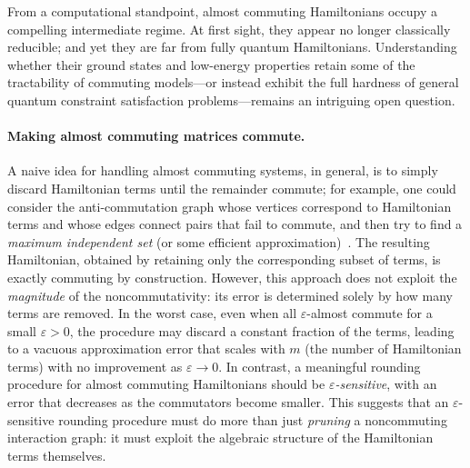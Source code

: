 \documentclass[a4paper,onecolumn,11pt]{quantumarticle}
\theoremstyle{plain}
\begin{document}
From a computational standpoint, almost commuting Hamiltonians occupy a compelling intermediate regime.  At first sight, they appear no longer classically reducible; and yet they are far from fully quantum Hamiltonians.  Understanding whether their ground states and low-energy properties retain some of the tractability of commuting models—or instead exhibit the full hardness of general quantum constraint satisfaction problems—remains an intriguing open question. 





\paragraph{Making almost commuting matrices commute.}

A naive idea for handling almost commuting systems, in general, is to simply discard Hamiltonian terms until the remainder commute; for example, one could consider the anti-commutation graph whose vertices correspond to Hamiltonian terms and whose edges connect pairs that fail to commute, and then try to find a \emph{maximum independent set} (or some efficient approximation)~\cite{10.1007/BF01994876}. The resulting Hamiltonian, obtained by retaining only the corresponding subset of terms, is exactly commuting by construction. However, this approach does not exploit the \emph{magnitude} of the noncommutativity: its error is determined solely by how many terms are removed. In the worst case, even when all $\varepsilon$-almost commute for a small $\varepsilon >0$, the procedure may discard a constant fraction of the terms, leading to a vacuous approximation error that scales with $m$ (the number of Hamiltonian terms) with no improvement as $\varepsilon \to 0$. 
In contrast, a meaningful rounding procedure for almost commuting Hamiltonians should be \emph{$\varepsilon$-sensitive}, with an error that decreases as the commutators become smaller. This suggests that an $\varepsilon$-sensitive rounding procedure must do more than just \emph{pruning} a noncommuting interaction graph: it must exploit the algebraic structure of the Hamiltonian terms themselves.
\end{document}
